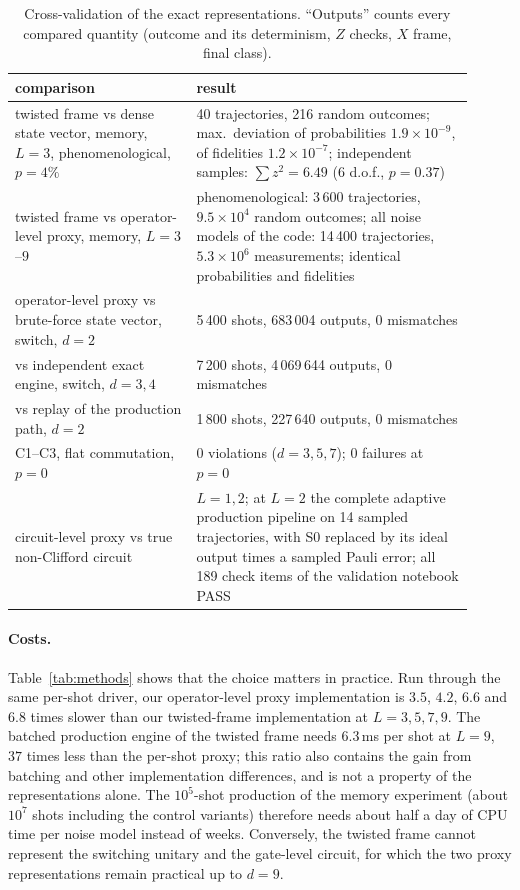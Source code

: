 \documentclass[a4paper]{article}
\begin{document}
\begin{table}[t]
\centering
\caption{Cross-validation of the exact representations. ``Outputs'' counts every compared quantity (outcome and its determinism, $Z$ checks, $X$ frame, final class).}
\label{tab:validation}
\small
\renewcommand{\arraystretch}{1.1}
\begin{tabular}{p{0.36\linewidth}p{0.55\linewidth}}
\toprule
comparison & result \\
\midrule
twisted frame vs dense state vector, memory, $L=3$, phenomenological, $p=4\%$ & 40 trajectories, 216 random outcomes; max.\ deviation of probabilities $1.9\times10^{-9}$, of fidelities $1.2\times10^{-7}$; independent samples: $\sum z^2=6.49$ (6 d.o.f., $p=0.37$) \\
twisted frame vs operator-level proxy, memory, $L=3$--$9$ & phenomenological: 3\,600 trajectories, $9.5\times10^4$ random outcomes; all noise models of the code: 14\,400 trajectories, $5.3\times10^6$ measurements; identical probabilities and fidelities \\
operator-level proxy vs brute-force state vector, switch, $d=2$ & 5\,400 shots, 683\,004 outputs, 0 mismatches \\
vs independent exact engine, switch, $d=3,4$ & 7\,200 shots, 4\,069\,644 outputs, 0 mismatches \\
vs replay of the production path, $d=2$ & 1\,800 shots, 227\,640 outputs, 0 mismatches \\
C1--C3, flat commutation, $p=0$ & 0 violations ($d=3,5,7$); 0 failures at $p=0$ \\
circuit-level proxy vs true non-Clifford circuit & $L=1,2$; at $L=2$ the complete adaptive production pipeline on 14 sampled trajectories, with S0 replaced by its ideal output times a sampled Pauli error; all 189 check items of the validation notebook PASS \\
\bottomrule
\end{tabular}
\end{table}

\paragraph{Costs.}
Table~\ref{tab:methods} shows that the choice matters in practice. Run through the same per-shot driver, our operator-level proxy implementation is $3.5$, $4.2$, $6.6$ and $6.8$ times slower than our twisted-frame implementation at $L=3,5,7,9$. The batched production engine of the twisted frame needs $6.3$\,ms per shot at $L=9$, $37$ times less than the per-shot proxy; this ratio also contains the gain from batching and other implementation differences, and is not a property of the representations alone. The $10^5$-shot production of the memory experiment (about $10^7$ shots including the control variants) therefore needs about half a day of CPU time per noise model instead of weeks. Conversely, the twisted frame cannot represent the switching unitary and the gate-level circuit, for which the two proxy representations remain practical up to $d=9$.
\end{document}
